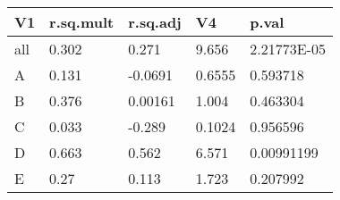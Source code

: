 \begin{table}[ht]
\centering
\begin{tabular}{lllll}
  \hline
V1 & r.sq.mult & r.sq.adj & V4 & p.val \\ 
  \hline
all & 0.302 & 0.271 & 9.656 & 2.21773E-05 \\ 
  A & 0.131 & -0.0691 & 0.6555 & 0.593718 \\ 
  B & 0.376 & 0.00161 & 1.004 & 0.463304 \\ 
  C & 0.033 & -0.289 & 0.1024 & 0.956596 \\ 
  D & 0.663 & 0.562 & 6.571 & 0.00991199 \\ 
  E & 0.27 & 0.113 & 1.723 & 0.207992 \\ 
   \hline
\end{tabular}
\end{table}
